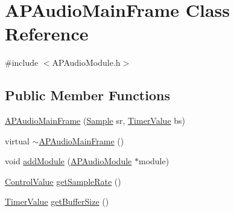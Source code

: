 \hypertarget{class_a_p_audio_main_frame}{\section{A\+P\+Audio\+Main\+Frame Class Reference}
\label{class_a_p_audio_main_frame}
}


{\ttfamily \#include $<$A\+P\+Audio\+Module.\+h$>$}

\subsection*{Public Member Functions}
\begin{DoxyCompactItemize}
\item 
\hyperlink{class_a_p_audio_main_frame_a201c9afa0d970e290e5cc700e4e1f20d}{A\+P\+Audio\+Main\+Frame} (\hyperlink{_a_p_audio_module_8h_a4ee69c206c9c7015dc653f7e716c4fe8}{Sample} sr, \hyperlink{_a_p_audio_module_8h_a7d836cc51adbed3f66d5c4c91ed72e94}{Timer\+Value} bs)
\item 
virtual \hyperlink{class_a_p_audio_main_frame_afb3c6b4fcdb13ed5e383fd3d0553aef0}{$\sim$\+A\+P\+Audio\+Main\+Frame} ()
\item 
void \hyperlink{class_a_p_audio_main_frame_a70b019c4781c1e5b3a7e30404c34ba89}{add\+Module} (\hyperlink{class_a_p_audio_module}{A\+P\+Audio\+Module} $\ast$module)
\item 
\hyperlink{_a_p_audio_module_8h_a9219378a2632ccf0389d00317ce8cdc4}{Control\+Value} \hyperlink{class_a_p_audio_main_frame_ae6c04e9910c1a474917ff92a66ac65cf}{get\+Sample\+Rate} ()
\item 
\hyperlink{_a_p_audio_module_8h_a7d836cc51adbed3f66d5c4c91ed72e94}{Timer\+Value} \hyperlink{class_a_p_audio_main_frame_a44826483620db4fb024f2d7d15460448}{get\+Buffer\+Size} ()
\end{DoxyCompactItemize}


